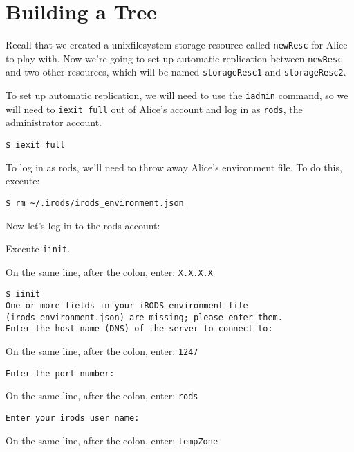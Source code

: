\documentclass[10pt,oneside]{memoir}
\begin{document}
\section{Building a Tree}

Recall that we created a unixfilesystem storage resource called \texttt{newResc} for Alice to play with. Now we're going to set up automatic replication between \texttt{newResc} and two other resources, which will be named \texttt{storageResc1} and \texttt{storageResc2}.

To set up automatic replication, we will need to use the \texttt{iadmin} command, so we will need to \texttt{iexit full} out of Alice's account and log in as \texttt{rods}, the administrator account.

\begin{lstlisting}
$ iexit full
\end{lstlisting}

To log in as rods, we'll need to throw away Alice's environment file. To do this, execute:

\begin{lstlisting}
$ rm ~/.irods/irods_environment.json
\end{lstlisting}

Now let's log in to the rods account:

Execute \texttt{iinit}.

On the same line, after the colon, enter: \texttt{X.X.X.X}

\begin{lstlisting}[basicstyle=\scriptsize\ttfamily]
$ iinit
One or more fields in your iRODS environment file (irods_environment.json) are missing; please enter them.
Enter the host name (DNS) of the server to connect to:
\end{lstlisting}

On the same line, after the colon, enter: \texttt{1247}

\begin{lstlisting}[basicstyle=\scriptsize\ttfamily]
Enter the port number:
\end{lstlisting}

On the same line, after the colon, enter: \texttt{rods}

\begin{lstlisting}[basicstyle=\scriptsize\ttfamily]
Enter your irods user name:
\end{lstlisting}

On the same line, after the colon, enter: \texttt{tempZone}
\end{document}
